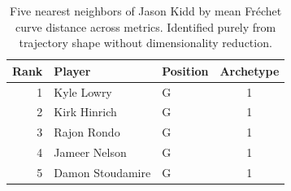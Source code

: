 \begin{table}[htbp]
  \centering\small
  \begin{tabular}{rllc}
    \toprule
    Rank & Player & Position & Archetype \\
    \midrule
    1 & Kyle Lowry & G & 1 \\
    2 & Kirk Hinrich & G & 1 \\
    3 & Rajon Rondo & G & 1 \\
    4 & Jameer Nelson & G & 1 \\
    5 & Damon Stoudamire & G & 1 \\
    \bottomrule
  \end{tabular}
  \caption{Five nearest neighbors of Jason Kidd by mean Fr\'{e}chet curve distance across metrics. Identified purely from trajectory shape without dimensionality reduction.}
  \label{tab:Jason_Kidd_frechet_curve_neighbors}
\end{table}

